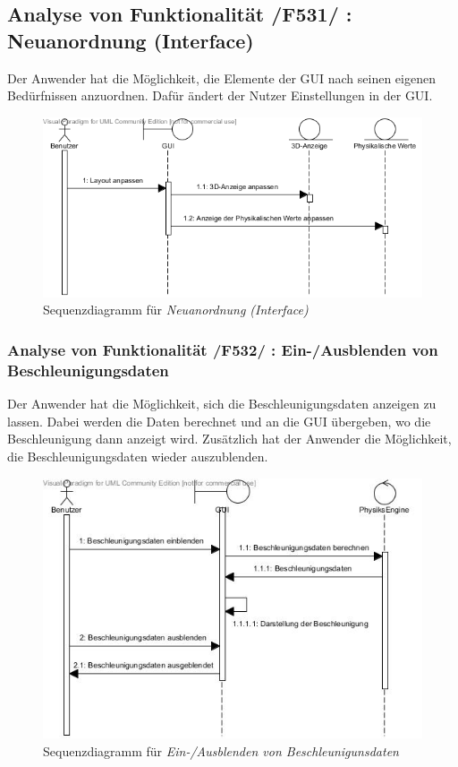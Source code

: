 \subsection{Analyse von Funktionalität /F531/ :   Neuanordnung (Interface)}
Der Anwender hat die Möglichkeit, die Elemente der GUI nach seinen eigenen Bedürfnissen anzuordnen. Dafür ändert der Nutzer Einstellungen in der GUI.

\begin{figure}[h!]
\includegraphics[width=\linewidth]{bilder/Interface_Neuanordnung}
\caption{Sequenzdiagramm für \textit{Neuanordnung (Interface)}}
\end{figure}
\subsubsection{Analyse von Funktionalität /F532/ :  Ein-/Ausblenden von Beschleunigungsdaten}
Der Anwender hat die Möglichkeit, sich die Beschleunigungsdaten anzeigen zu lassen. Dabei werden die Daten berechnet und an die GUI übergeben, wo die Beschleunigung dann anzeigt wird. Zusätzlich hat der Anwender die Möglichkeit, die Beschleunigungsdaten wieder auszublenden.

\begin{figure}[h!]
\includegraphics[width=\linewidth]{bilder/Simulator_Beschleunigung}
\caption{Sequenzdiagramm für \textit{Ein-/Ausblenden von Beschleunigunsdaten}}
\end{figure}

